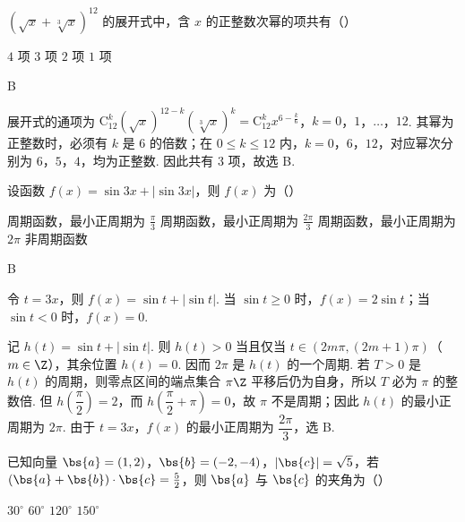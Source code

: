 \begin{problem}
\((\sqrt{x}+\sqrt[3]{x})^{12}\) 的展开式中，含 \(x\) 的正整数次幂的项共有（\quad）

\choices
    {\(4\) 项}
    {\(3\) 项}
    {\(2\) 项}
    {\(1\) 项}
\end{problem}

\begin{answer}B\end{answer}

\begin{solution}
展开式的通项为
\(\mathrm C_{12}^{k}(\sqrt{x})^{12-k}(\sqrt[3]{x})^{k}=\mathrm C_{12}^{k}x^{6-\frac{k}{6}}\)，\(k=0\)，\(1\)，\(\ldots\)，\(12\).
其幂为正整数时，必须有 \(k\) 是 \(6\) 的倍数；在 \(0\leqslant k\leqslant12\) 内，\(k=0\)，\(6\)，\(12\)，对应幂次分别为 \(6\)，\(5\)，\(4\)，均为正整数. 因此共有 \(3\) 项，故选 B.
\end{solution}

\begin{problem}
设函数 \(f(x)=\sin 3x+|\sin 3x|\)，则 \(f(x)\) 为（\quad）

\choices
    {周期函数，最小正周期为 \(\frac{\pi}{3}\)}
    {周期函数，最小正周期为 \(\frac{2\pi}{3}\)}
    {周期函数，最小正周期为 \(2\pi\)}
    {非周期函数}
\end{problem}

\begin{answer}B\end{answer}

\begin{solution}
令 \(t=3x\)，则 \(f(x)=\sin t+\lvert\sin t\rvert\). 当 \(\sin t\geqslant0\) 时，\(f(x)=2\sin t\)；当 \(\sin t<0\) 时，\(f(x)=0\).

记 \(h(t)=\sin t+\lvert\sin t\rvert\). 则 \(h(t)>0\) 当且仅当
\(t\in(2m\pi,(2m+1)\pi)\)（\(m\in\Z\)），其余位置 \(h(t)=0\).
因而 \(2\pi\) 是 \(h(t)\) 的一个周期. 若 \(T>0\) 是 \(h(t)\) 的周期，则零点区间的端点集合
\(\pi\Z\) 平移后仍为自身，所以 \(T\) 必为 \(\pi\) 的整数倍. 但
\(h\left(\dfrac{\pi}{2}\right)=2\)，而
\(h\left(\dfrac{\pi}{2}+\pi\right)=0\)，故 \(\pi\) 不是周期；因此 \(h(t)\) 的最小正周期为
\(2\pi\). 由于 \(t=3x\)，\(f(x)\) 的最小正周期为 \(\dfrac{2\pi}{3}\)，选 B.
\end{solution}

\begin{problem}
已知向量 \(\bs{a}=(1,2)\)，\(\bs{b}=(-2,-4)\)，\(|\bs{c}|=\sqrt{5}\)，若 \((\bs{a}+\bs{b})\cdot\bs{c}=\frac{5}{2}\)，则 \(\bs{a}\) 与 \(\bs{c}\) 的夹角为（\quad）

\choices
    {\(30^{\circ}\)}
    {\(60^{\circ}\)}
    {\(120^{\circ}\)}
    {\(150^{\circ}\)}
\end{problem}

